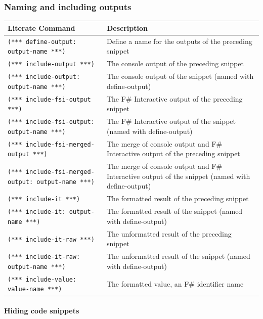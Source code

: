 \documentclass{article}
\begin{document}
\subsubsection*{Naming and including outputs}

\begin{tabular}{|l|l|}\hline
\textbf{Literate Command} & \textbf{Description}\\ \hline\hline
\texttt{(*** define-output: output-name ***)} & Define a name for the outputs of the preceding snippet\\ \hline
\texttt{(*** include-output ***)} & The console output of the preceding snippet\\ \hline
\texttt{(*** include-output: output-name ***)} & The console output of the snippet (named with define-output)\\ \hline
\texttt{(*** include-fsi-output ***)} & The F\# Interactive output of the preceding snippet\\ \hline
\texttt{(*** include-fsi-output: output-name ***)} & The F\# Interactive output of the snippet (named with define-output)\\ \hline
\texttt{(*** include-fsi-merged-output ***)} & The merge of console output and F\# Interactive output of the preceding snippet\\ \hline
\texttt{(*** include-fsi-merged-output: output-name ***)} & The merge of console output and F\# Interactive output of the snippet (named with define-output)\\ \hline
\texttt{(*** include-it ***)} & The formatted result of the preceding snippet\\ \hline
\texttt{(*** include-it: output-name ***)} & The formatted result of the snippet (named with define-output)\\ \hline
\texttt{(*** include-it-raw ***)} & The unformatted result of the preceding snippet\\ \hline
\texttt{(*** include-it-raw: output-name ***)} & The unformatted result of the snippet (named with define-output)\\ \hline
\texttt{(*** include-value: value-name ***)} & The formatted value, an F\# identifier name\\ \hline
\end{tabular}

\paragraph{Hiding code snippets}
\end{document}

